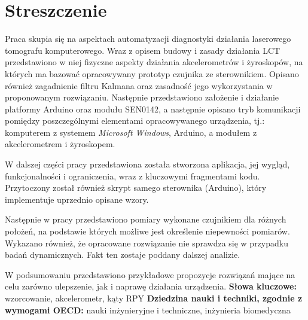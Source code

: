 \chapter*{Streszczenie}
\indent Praca skupia się na aspektach automatyzacji diagnostyki działania laserowego tomografu komputerowego. Wraz z opisem budowy i zasady działania LCT przedstawiono w niej fizyczne aspekty działania akcelerometrów i żyroskopów, na których ma bazować opracowywany prototyp czujnika ze sterownikiem. Opisano również zagadnienie filtru Kalmana oraz zasadność jego wykorzystania w proponowanym rozwiązaniu. Następnie przedstawiono założenie i działanie platformy Arduino oraz modułu SEN0142, a następnie opisano tryb komunikacji pomiędzy poszczególnymi elementami opracowywanego urządzenia, tj.: komputerem z systemem \emph{Microsoft Windows}, Arduino, a modułem z akcelerometrem i żyroskopem.

\indent W dalszej części pracy przedstawiona została stworzona aplikacja, jej wygląd, funkcjonalności i ograniczenia, wraz z kluczowymi fragmentami kodu. Przytoczony został również skrypt samego sterownika (Arduino), który implementuje uprzednio opisane wzory.

\indent Następnie w pracy przedstawiono pomiary wykonane czujnikiem dla różnych położeń, na podstawie których możliwe jest określenie niepewności pomiarów. Wykazano również, że opracowane rozwiązanie nie sprawdza się w przypadku badań dynamicznych. Fakt ten zostaje poddany dalszej analizie.

\indent W podsumowaniu przedstawiono przykładowe propozycje rozwiązań mające na celu zarówno ulepszenie, jak i naprawę działania urządzenia.
\vspace{0.5cm}\newline
\textbf{Słowa kluczowe:} wzorcowanie, akcelerometr, kąty RPY
\vspace{0.5cm}\newline
\noindent \textbf{Dziedzina nauki i techniki, zgodnie z wymogami OECD:} nauki inżynieryjne i techniczne, inżynieria biomedyczna
